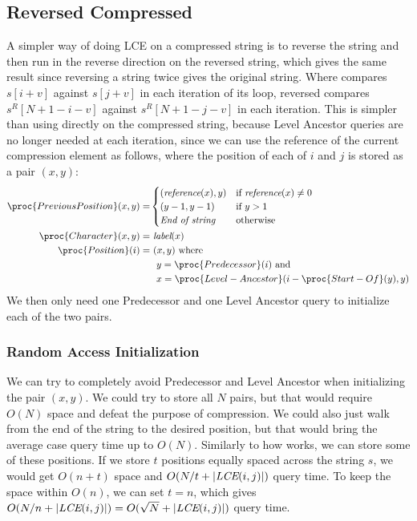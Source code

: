 \documentclass[a4]{article}
\begin{document}
\subsection{Reversed Compressed }

A simpler way of doing LCE on a compressed string is to reverse the string and then run  in the reverse direction on the reversed string, which gives the same result since reversing a string twice gives the original string. Where  compares $s[i+v]$ against $s[j+v]$ in each iteration of its loop, reversed  compares $s^R[N+1-i-v]$ against $s^R[N+1-j-v]$ in each iteration. This is simpler than using  directly on the compressed string, because Level Ancestor queries are no longer needed at each iteration, since we can use the reference of the current compression element as follows, where the position of each of $i$ and $j$ is stored as a pair $(x,y)$:
\begin{align*}
\proc{PreviousPosition}(x, y)=&
\begin{cases}
(\zreference(x), y) & \textrm{if} ~ \zreference(x) \neq 0 \\
(y-1, y-1) & \textrm{if} ~ y > 1\\
\textit{End of string} & \textrm{otherwise}
\end{cases}\\
\proc{Character}(x, y)=&~\zlabel(x)\\
\proc{Position}(i)=&~(x,y)~\textrm{where}\\
&~~y=\proc{Predecessor}(i)~\textrm{and}\\
&~~x=\proc{Level-Ancestor}(i-\proc{Start-Of}(y), y)
\end{align*}
We then only need one Predecessor and one Level Ancestor query to initialize each of the two pairs.

\subsubsection{Random Access Initialization}

We can try to completely avoid Predecessor and Level Ancestor when initializing the pair $(x,y)$. We could try to store all $N$ pairs, but that would require $O(N)$ space and defeat the purpose of compression. We could also just walk from the end of the string to the desired position, but that would bring the average case query time up to $O(N)$. Similarly to how  works, we can store some of these positions. If we store $t$ positions equally spaced across the string $s$, we would get $O(n+t)$ space and $O(N/t+|\textit{LCE}(i,j)|)$ query time. To keep the space within $O(n)$, we can set $t=n$, which gives $O(N/n+|\textit{LCE}(i,j)|) = O(\sqrt{N}+|\textit{LCE}(i,j)|)$ query time. 
\end{document}
